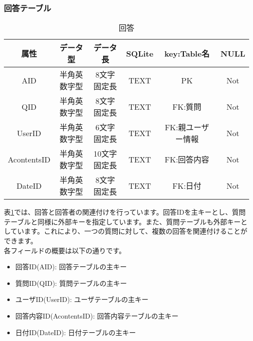 \documentclass[a4j]{jarticle}
\begin{document}
\subsubsection{回答テーブル}
\begin{table}[H]
    \caption{回答}
    \label{tbl: answer}
    \begin{center}
        \begin{tabular}{|c|c|c|c|c|c|} \hline
            属性 & データ型 & データ長 & SQLite & key:Table名 & NULL\\ \hline \hline
            AID & 半角英数字型 & 8文字固定長 & TEXT & PK & Not\\ \hline
            QID & 半角英数字型 & 8文字固定長 & TEXT & FK:質問 & Not\\ \hline
            UserID & 半角英数字型 & 6文字固定長 & TEXT & FK:親ユーザー情報 & Not\\ \hline
            AcontentsID & 半角英数字型 & 10文字固定長 & TEXT & FK:回答内容 & Not\\ \hline
            DateID & 半角英数字型 & 8文字固定長 & TEXT & FK:日付 & Not\\ \hline
        \end{tabular}
    \end{center}
\end{table}
表\ref{tbl: answer}では、回答と回答者の関連付けを行っています。回答IDを主キーとし、質問テーブルと同様に外部キーを指定しています。また、質問テーブルも外部キーとしています。これにより、一つの質問に対して、複数の回答を関連付けることができます。\\
各フィールドの概要は以下の通りです。
\begin{itemize}
  \item 回答ID(AID):
  回答テーブルの主キー
  \item 質問ID(QID):
  質問テーブルの主キー
  \item ユーザID(UserID):
  ユーザテーブルの主キー
  \item 回答内容ID(AcontentsID):
  回答内容テーブルの主キー
  \item 日付ID(DateID):
  日付テーブルの主キー
\end{itemize}
\end{document}
